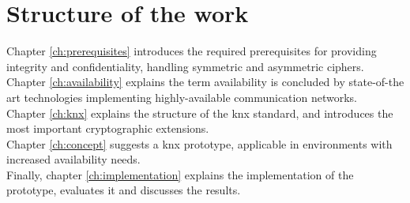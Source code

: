 \section{Structure of the work}

Chapter \ref{ch:prerequisites} introduces the required prerequisites for providing integrity and confidentiality, handling symmetric and asymmetric ciphers. 
Chapter \ref{ch:availability} explains the term availability is concluded by state-of-the art technologies implementing highly-available communication networks.
\\
Chapter \ref{ch:knx} explains the structure of the \gls{knx} standard, and introduces the most important cryptographic extensions.
\\
Chapter \ref{ch:concept} suggests a \gls{knx} prototype, applicable in environments with increased availability needs.
\\
Finally, chapter \ref{ch:implementation} explains the implementation of the prototype, evaluates it and discusses the results.



